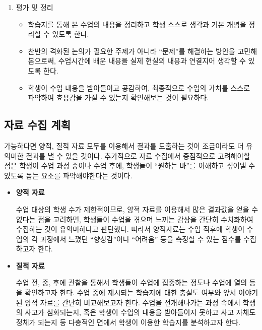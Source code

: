 \documentclass[10pt, a4paper, chapter]{oblivoir}
\begin{document}
\begin{enumerate}
\begin{enumerate}
\begin{itemize}[-]
                \end{itemize}
            \end{enumerate}
        \item{평가 및 정리}
        \begin{itemize}[-]
            \item 학습지를 통해 본 수업의 내용을 정리하고 학생 스스로 생각과 기본 개념을 정리할 수 있도록 한다. 
            \item 찬반의 격화된 논의가 필요한 주제가 아니라 ``문제''를 해결하는 방안을 고민해봄으로써, 수업시간에 배운 내용을 실제 현실의 내용과 연결지어 생각할 수 있도록 한다. 
            \item 학생이 수업 내용을 받아들이고 공감하여, 최종적으로 수업의 가치를 스스로 파악하여 효용감을 가질 수 있는지 확인해보는 것이 필요하다. 
        \end{itemize}
    \end{enumerate}


        \subsection{자료 수집 계획}
        가능하다면 양적, 질적 자료 모두를 이용해서 결과를 도출하는 것이 조금이라도 더 유의미한 결과를 낼 수 있을 것이다. 추가적으로 자료 수집에서
        중점적으로 고려해야할 점은 학생이 수업 과정 중이나 수업 후에, 학생들이 ``원하는 바''를 이해하고 짚어낼 수 있도록 돕는 요소를 파악해야한다는 것이다.
        \begin{itemize}[-]
            \item \textbf{양적 자료}
            

            수업 대상의 학생 수가 제한적이므로, 양적 자료를 이용해서 많은 결과값을 얻을 수 없다는 점을 고려하면, 학생들이 
            수업을 겪으며 느끼는 감상을 간단히 수치화하여 수집하는 것이 유의미하다고 판단했다. 따라서 양적자료는 수업 직후에 
            학생이 수업의 각 과정에서 느꼈던 ``향상감''이나 ``어려움'' 등을 측정할 수 있는 점수를 수집하고자 한다. 
            \item \textbf{질적 자료}
            

            수업 전, 중, 후에 관찰을 통해서 학생들이 수업에 집중하는 정도나 수업에 열의 등을 확인하고자 한다. 수업 중에 
            제시되는 학습지에 대한 충실도 여부와 앞서 이야기된 양적 자료를 간단히 비교해보고자 한다. 수업을 전개해나가는 과정 속에서 
            학생의 사고가 심화되는지, 혹은 학생이 수업의 내용을 받아들이지 못하고 사고 자체도 정체가 되는지 등 다층적인 면에서 학생이 
            이용한 학습지를 분석하고자 한다. 
        \end{itemize}
\end{document}
